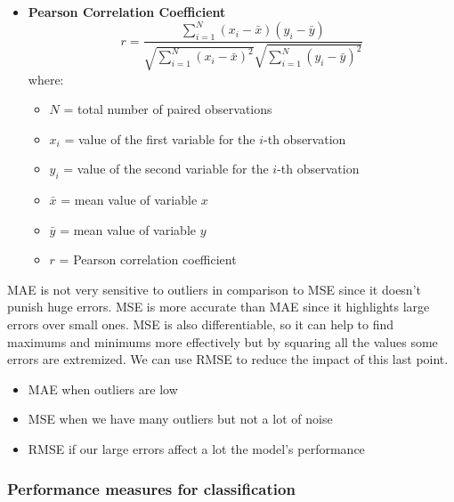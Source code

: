 \begin{itemize}
    \item \textbf{Pearson Correlation Coefficient}
    \[
    r = \frac{\sum_{i=1}^{N}(x_i - \bar{x})(y_i - \bar{y})}
    {\sqrt{\sum_{i=1}^{N}(x_i - \bar{x})^2}\sqrt{\sum_{i=1}^{N}(y_i - \bar{y})^2}}
    \]
    where:
    \begin{itemize}
        \item $N$ = total number of paired observations
        \item $x_i$ = value of the first variable for the $i$-th observation
        \item $y_i$ = value of the second variable for the $i$-th observation
        \item $\bar{x}$ = mean value of variable $x$
        \item $\bar{y}$ = mean value of variable $y$
        \item $r$ = Pearson correlation coefficient
    \end{itemize}

\end{itemize}

\vspace{10pt}

MAE is not very sensitive to outliers in comparison to MSE since it doesn't punish huge errors. MSE is more accurate than MAE since it highlights large errors over small ones. MSE is also differentiable, so it can help to find maximums and minimums more effectively but by squaring all the values some errors are extremized. We can use RMSE to reduce the impact of this last point.

\begin{itemize}
    \item MAE \ra when outliers are low 
    \item MSE \ra when we have many outliers but not a lot of noise
    \item RMSE \ra if our large errors affect a lot the model's performance 
\end{itemize}

\subsubsection{Performance measures for classification}


